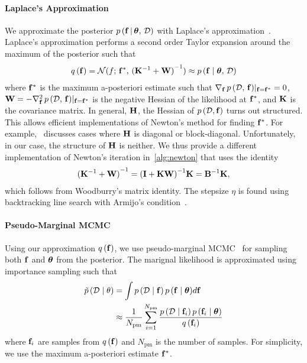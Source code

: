 \paragraph{Laplace's Approximation}
We approximate the posterior \(p\,(\mathbf{f}\,|\,\bm{\theta},\, \mathcal{D})\) with Laplace's approximation~\cite{williams_bayesian_1998}.
Laplace's approximation performs a second order Taylor expansion around the maximum of the posterior such that
\begin{align}
q\,(\mathbf{f}) = \mathcal{N}(f;\, \mathbf{f}^*,\, {(\mathbf{K}^{-1} + \mathbf{W})}^{-1}) \approx p\,(\mathbf{f} \mid \bm{\theta},\, \mathcal{D})
\end{align}
where \(\mathbf{f}^*\) is the maximum a-posteriori estimate such that \(\nabla_{\mathbf{f}}\, p\,(\mathcal{D},\, \mathbf{f})|_{\mathbf{f} = \mathbf{f}^*} = 0\), \(\mathbf{W} = -\nabla^2_{\mathbf{f}}\, p\,(\mathcal{D},\,\mathbf{f})|_{\mathbf{f}=\mathbf{f}^*} \) is the negative Hessian of the likelihood at \(\mathbf{f}^*\), and \(\mathbf{K}\) is the covariance matrix.
In general, \(\mathbf{H}\), the Hessian of \(p\,(\mathcal{D},\mathbf{f})\) turns out structured.
This allows efficient implementations of Newton's method for finding \(\mathbf{f}^*\).
For example,~\cite{rasmussen_gaussian_2006} discusses cases where \(\mathbf{H}\) is diagonal or block-diagonal.
Unfortunately, in our case, the structure of \(\mathbf{H}\) is neither.
We thus provide a different implementation of Newton's iteration in~\cref{alg:newton} that uses the identity
\begin{align}
  {(\mathbf{K}^{-1} + \mathbf{W})}^{-1} = {(\mathbf{I} + \mathbf{K} \mathbf{W} )}^{-1} \mathbf{K} = \mathbf{B}^{-1} \mathbf{K} ,
\end{align}
which follows from Woodburry's matrix identity.
The stepsize \(\eta\) is found using backtracking line search with Armijo's condition~\cite{nocedal_numerical_2006}.

\paragraph{Pseudo-Marginal MCMC}
Using our approximation \(q\,(\mathbf{f})\), we use pseudo-marginal MCMC~\cite{filippone_pseudomarginal_2014} for sampling both \(\mathbf{f}\) and \(\bm{\theta}\) from the posterior.
The marignal likelihood is approximated using importance sampling such that
\begin{align}
  \tilde{p}\,(\mathcal{D}\mid\theta)
  &= \int p\,(\mathcal{D}\mid\mathbf{f})\,p\,(\mathbf{f}\mid\bm{\theta}) d\mathbf{f} \\
  &\approx \frac{1}{N_{\mathrm{pm}}} \sum^{N_{\mathrm{pm}}}_{i=1} \frac{p\,(\mathcal{D}\mid\mathbf{f}_i)\,p\,(\mathbf{f}_i\mid\bm{\theta})}{q\,(\mathbf{f}_i)}
\end{align}
where \(\mathbf{f}_i\) are samples from \(q\,(\mathbf{f})\) and \(N_{\mathrm{pm}}\) is the number of samples.
For simplicity, we use the maximum a-posteriori estimate \(\mathbf{f}^*\).

